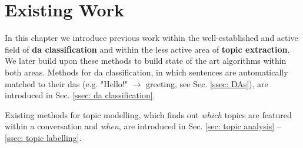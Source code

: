 \chapter{Existing Work}


In this chapter we introduce previous work within the well-established and active field of \textbf{\gls{da} classification} and within the less active area of \textbf{topic extraction}. We later build upon these methods to build state of the art algorithms within both areas. 
Methods for \gls{da} classification, in which sentences are automatically matched to their \glspl{da} (e.g. "Hello!" $\rightarrow$ greeting, see Sec. \ref{ssec: DAs}), are introduced in Sec. \ref{ssec: da classification}.

Existing methods for topic modelling, which finds out \textit{which} topics are featured within a conversation and \textit{when}, are introduced in Sec. \ref{sec: topic analysis} -- \ref{ssec: topic labelling}.



 

 


\glsresetall